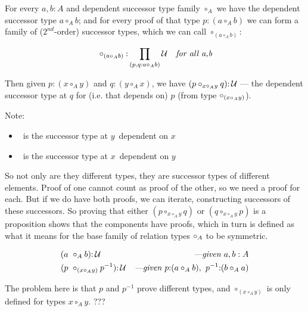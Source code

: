 \documentclass{article}
\begin{document}
For every \(a,b{:}A\) and dependent successor type family \(\circ_A\)
we have the dependent successor type \(a\circ_A b\); and for every
proof of that type \(p{:}(a\circ_A b)\) we can form a family of
(\(2^{nd}\)-order) successor types, which we can call \(\circ_{(a\circ_A b)}\):

\begin{align}
  &\circ_{(a\circ_A b)}{:}\prod\limits_{(p,q:a\circ_Ab)}\mathcal{U} & \textit{for all a,b}
\end{align}


Then given \(p{:}(x\circ_A y)\) and \(q{:}(y\circ_A x)\), we have
\((p\circ_{x\circ_A y} q){:}\,\mathcal{U}\) --- the dependent successor type
at \(q\) for (i.e. that depends on) \(p\) (from type \(\circ_{(x\circ_Ay)}\)).

Note:

\begin{itemize}
  \item \xrely\ is the successor type at \(y\)\ dependent on \(x\)
  \item \yrelx\ is the successor type at \(x\)\ dependent on \(y\)
\end{itemize}

So not only are they different types, they are successor types of
different elements.  Proof of one cannot count as proof of the other,
so we need a proof for each.  But if we do have both proofs, we can
iterate, constructing successors of these successors.  So proving that
either \((p\circ_{x\circ_A y} q)\) or \((q\circ_{x\circ_A y} p)\) is a
proposition shows that the components have proofs, which in turn is
defined as what it means for the base family of relation types
\(\circ_A\) to be symmetric.

 \begin{align}
   (a\ &\circ_A b){:}\,\mathcal{U} & \textit{---given \(a,b:A\)} \\
   (p\ &\circ_{(x\circ_Ay)} p^{-1}){:}\,\mathcal{U} & \textit{---given \(p{:}(a\circ_A b),\  p^{-1}{:}(b\circ_A a)\)}
\end{align}

The problem here is that \(p\) and \(p^{-1}\) prove different types, and
\(\circ_{(x\circ_Ay)}\) is only defined for types \(x\circ_A y\). ???
\end{document}
